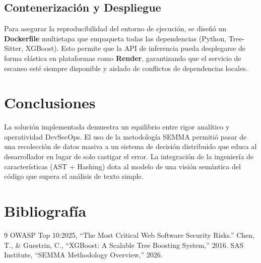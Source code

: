 \documentclass[11pt,a4paper]{article}
\begin{document}
\subsection{Contenerización y Despliegue}
Para asegurar la reproducibilidad del entorno de ejecución, se diseñó un \textbf{Dockerfile} multietapa que empaqueta todas las dependencias (Python, Tree-Sitter, XGBoost). Esto permite que la API de inferencia pueda desplegarse de forma elástica en plataformas como \textbf{Render}, garantizando que el servicio de escaneo esté siempre disponible y aislado de conflictos de dependencias locales.

\section{Conclusiones}
La solución implementada demuestra un equilibrio entre rigor analítico y operatividad DevSecOps. El uso de la metodología SEMMA permitió pasar de una recolección de datos masiva a un sistema de decisión distribuido que educa al desarrollador en lugar de solo castigar el error. La integración de la ingeniería de características (AST + Hashing) dota al modelo de una visión semántica del código que supera el análisis de texto simple.

\section{Bibliografía}
\begin{thebibliography}{9}
 OWASP Top 10:2025, ``The Most Critical Web Software Security Risks.''
 Chen, T., \& Guestrin, C., ``XGBoost: A Scalable Tree Boosting System,'' 2016.
 SAS Institute, ``SEMMA Methodology Overview,'' 2026.
\end{thebibliography}
\end{document}
